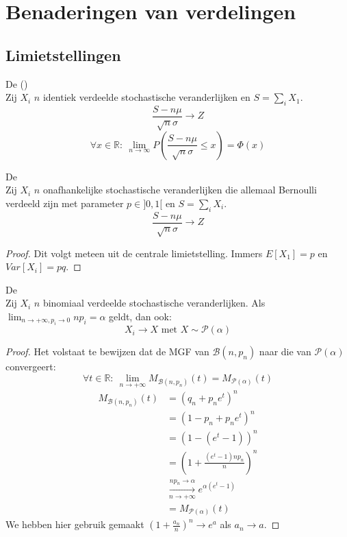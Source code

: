 \documentclass[main.tex]{subfiles}
\begin{document}
\chapter{Benaderingen van verdelingen}
\label{cha:benad-van-verd}

\section{Limietstellingen}
\label{sec:limietstellingen}

\begin{st}
  De  ()\\
  Zij $X_{i}$ $n$ identiek verdeelde stochastische veranderlijken en $S = \sum_{i}X_{1}$.
  \[ \frac{S-n\mu}{\sqrt{n}\sigma} \rightarrow Z \]
  \[ \forall x \in \mathbb{R}:\ \lim_{n \rightarrow \infty} P\left(\frac{S - n\mu}{\sqrt{n}\sigma} \le x\right) = \Phi(x) \]
  \zb
\end{st}

\begin{st}
  De \\
  Zij $X_{i}$ $n$ onafhankelijke stochastische veranderlijken die allemaal Bernoulli verdeeld zijn met parameter $p\in ]0,1[$ en $S = \sum_{i}X_{i}$.
  \[ \frac{S-n\mu}{\sqrt{n}\sigma} \rightarrow Z \]

  \begin{proof}
    Dit volgt meteen uit de centrale limietstelling.
    Immers $E[X_{1}] = p$ en $Var[X_{i}] = pq$.\needed
  \end{proof}
\end{st}

\begin{st}
  De \\
  Zij $X_{i}$ $n$ binomiaal verdeelde stochastische veranderlijken.
  Als $\lim_{n \rightarrow +\infty, p_{i} \rightarrow 0}np_{i} = \alpha$ geldt, dan ook:
  \[
  X_{i} \rightarrow X \text{ met } X \sim \mathcal{P}(\alpha)
  \]

  \begin{proof}
    Het volstaat te bewijzen dat de MGF van $\mathcal{B}(n,p_{n})$ naar die van $\mathcal{P}(\alpha)$ convergeert:
    \[ \forall t\in \mathbb{R}:\ \lim_{n\rightarrow +\infty}M_{\mathcal{B}(n,p_{n})}(t) = M_{\mathcal{P}(\alpha)}(t) \]
    \begin{align*}
       M_{\mathcal{B}(n,p_{n})}(t)
       &= (q_{n} + p_{n}e^{t})^{n}\\
       &= (1-p_{n} + p_{n}e^{t})^{n}\\
       &= (1 - (e^{t}-1))^{n}\\
       &= \left( 1 + \frac{(e^{t}-1)np_{n}}{n}\right)^{n}\\
       &\overset{np_{n}\rightarrow \alpha}{\underset{n\rightarrow+\infty}{\longrightarrow}}
       e^{\alpha\left(e^{t}-1\right)}\\
       &= M_{\mathcal{P}(\alpha)}(t)
    \end{align*}
    We hebben hier gebruik gemaakt $\left(1 + \frac{a_{n}}{n}\right)^{n} \rightarrow e^{a}$ als $a_{n}\rightarrow a$.
  \end{proof}
\end{st}
\end{document}
